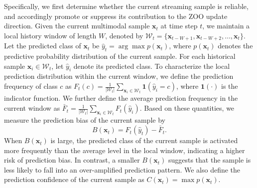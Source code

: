 Specifically, we first determine whether the current streaming sample is reliable, and accordingly promote or suppress its contribution to the ZOO update direction.
Given the current multimodal sample $\mathbf{x}_t$ at time step $t$, we maintain a local history window of length $W$, denoted by $\mathcal{W}_t = \{\mathbf{x}_{t-W+1}, \mathbf{x}_{t-W+2}, \dots, \mathbf{x}_t\}$.
Let the predicted class of $\mathbf{x}_t$ be $\hat{y}_t=\arg\max p(\mathbf{x}_t)$, where $p(\mathbf{x}_t)$ denotes the predictive probability distribution of the current sample.
For each historical sample $\mathbf{x}_i\in\mathcal{W}_t$, let $\hat{y}_i$ denote its predicted class.
To characterize the local prediction distribution within the current window, we define the prediction frequency of class $c$ as $F_t(c)=\frac{1}{|\mathcal{W}_t|}\sum_{\mathbf{x}_i\in \mathcal{W}_t}\mathbf{1}(\hat y_i=c)$, where $\mathbf{1}(\cdot)$ is the indicator function.
We further define the average prediction frequency in the current window as $\bar{F}_t=\frac{1}{|\mathcal{W}_t|}\sum_{\mathbf{x}_i\in \mathcal{W}_t}F_t(\hat{y}_i)$.
Based on these quantities, we measure the prediction bias of the current sample by
\begin{equation}
\label{eq:bias_score}
B(\mathbf{x}_t)=F_t(\hat{y}_t)-\bar{F}_t.
\end{equation}
When $B(\mathbf{x}_t)$ is large, the predicted class of the current sample is activated more frequently than the average level in the local window, indicating a higher risk of prediction bias.
In contrast, a smaller $B(\mathbf{x}_t)$ suggests that the sample is less likely to fall into an over-amplified prediction pattern.
We also define the prediction confidence of the current sample as $C(\mathbf{x}_t)=\max p(\mathbf{x}_t)$.

